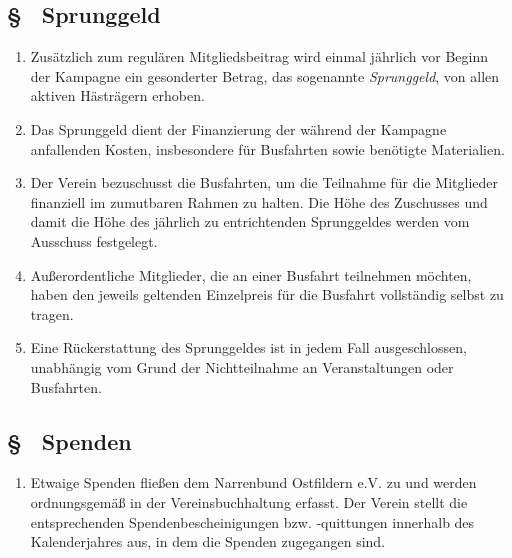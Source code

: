 \subsection{§ \thegoparagraphcounter\ Sprunggeld} \label{go:par:sprunggeld}
\begin{enumerate}
    \item \label{go:abs:e1si6l} Zusätzlich zum regulären Mitgliedsbeitrag wird einmal jährlich vor Beginn der Kampagne ein gesonderter Betrag, das sogenannte \textit{Sprunggeld}, von allen aktiven Hästrägern erhoben.

    \item \label{go:abs:84buky} Das Sprunggeld dient der Finanzierung der während der Kampagne anfallenden Kosten, insbesondere für Busfahrten sowie benötigte Materialien.

    \item \label{go:abs:yaloam} Der Verein bezuschusst die Busfahrten, um die Teilnahme für die Mitglieder finanziell im zumutbaren Rahmen zu halten. Die Höhe des Zuschusses und damit die Höhe des jährlich zu entrichtenden Sprunggeldes werden vom Ausschuss festgelegt.

    \item \label{go:abs:cp3v21} Außerordentliche Mitglieder, die an einer Busfahrt teilnehmen möchten, haben den jeweils geltenden Einzelpreis für die Busfahrt vollständig selbst zu tragen.

    \item \label{go:abs:rflvyp} Eine Rückerstattung des Sprunggeldes ist in jedem Fall ausgeschlossen, unabhängig vom Grund der Nichtteilnahme an Veranstaltungen oder Busfahrten.
\end{enumerate}

\subsection{§ \thegoparagraphcounter\ Spenden} \label{go:par:spenden}
\begin{enumerate}
    \item \label{go:abs:fs63cc} Etwaige Spenden fließen dem Narrenbund Ostfildern e.V. zu und werden ordnungsgemäß in der Vereinsbuchhaltung erfasst. Der Verein stellt die entsprechenden Spendenbescheinigungen bzw. -quittungen innerhalb des Kalenderjahres aus, in dem die Spenden zugegangen sind.
\end{enumerate}

